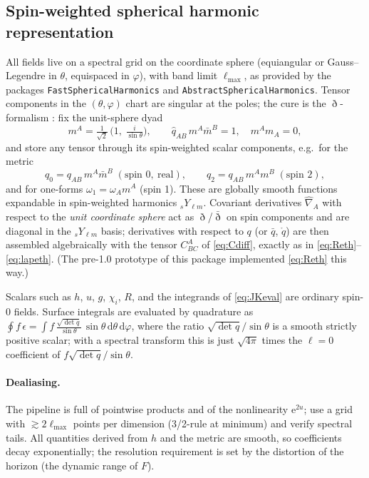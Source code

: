 \documentclass[11pt]{article}
\newcommand{\dd}{\mathrm{d}}
\newcommand{\ee}{\mathrm{e}}
\newcommand{\qo}{\mathring{q}}          %
\newcommand{\bareth}{\bar{\eth}}   %
\begin{document}
\subsection{Spin-weighted spherical harmonic representation}

All fields live on a spectral grid on the coordinate sphere (equiangular or
Gauss--Legendre in $\theta$, equispaced in $\varphi$), with band limit
$\ell_{\max}$, as provided by the packages \texttt{FastSphericalHarmonics}
and \texttt{Abstract\-Spherical\-Harmonics}.  Tensor components in the
$(\theta,\varphi)$ chart are singular at the poles; the cure is the
$\eth$-formalism \cite{gomez1997}: fix the unit-sphere dyad
\begin{equation}
  m^A = \tfrac{1}{\sqrt2}\,\bigl(1,\; \tfrac{i}{\sin\theta}\bigr),
  \qquad
  \hat q_{AB}\,m^A\bar m^B = 1,\quad m^Am_A = 0,
\end{equation}
and store any tensor through its spin-weighted scalar components, e.g.\ for
the metric
\begin{equation}
  q_0 = q_{AB}\,m^A\bar m^B \;(\text{spin } 0,\ \text{real}),
  \qquad
  q_2 = q_{AB}\,m^A m^B \;(\text{spin } 2),
\end{equation}
and for one-forms $\omega_1 = \omega_A m^A$ (spin 1).  These are globally
smooth functions expandable in spin-weighted harmonics ${}_sY_{\ell m}$.
Covariant derivatives $\hat\nabla_A$ with respect to the \emph{unit
coordinate sphere} act as $\eth$/$\bareth$ on spin components and are
diagonal in the ${}_sY_{\ell m}$ basis; derivatives with respect to $q$ (or
$\bar q$, $\qo$) are then assembled algebraically with the tensor
$C^A_{BC}$ of \eqref{eq:Cdiff}, exactly as in
\eqref{eq:Reth}--\eqref{eq:lapeth}.  (The pre-1.0 prototype of this
package implemented \eqref{eq:Reth} this way.)

Scalars such as $h$, $u$, $g$, $\chi_i$, $R$, and the integrands of
\eqref{eq:JKeval} are ordinary spin-0 fields.  Surface integrals are
evaluated by quadrature as
$\oint f\,\epsilon = \int f\,\frac{\sqrt{\det q}}{\sin\theta}\,
\sin\theta\,\dd\theta\,\dd\varphi$, where the ratio
$\sqrt{\det q}/\sin\theta$ is a smooth strictly positive scalar; with a
spectral transform this is just $\sqrt{4\pi}$ times the $\ell=0$ coefficient
of $f\sqrt{\det q}/\sin\theta$.

\paragraph{Dealiasing.}  The pipeline is full of pointwise products and of
the nonlinearity $\ee^{2u}$; use a grid with $\gtrsim 2\ell_{\max}$ points
per dimension (3/2-rule at minimum) and verify spectral tails.  All
quantities derived from $h$ and the metric are smooth, so coefficients decay
exponentially; the resolution requirement is set by the distortion of the
horizon (the dynamic range of $F$).
\end{document}
